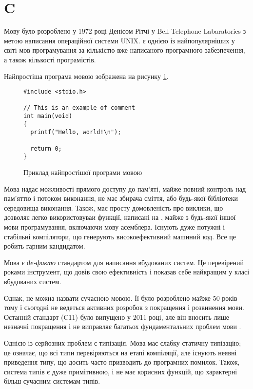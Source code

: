 \documentclass[main.tex]{subfiles}
\begin{document}
\section{C}

Мову \LangC{} було розроблено у 1972 році Денісом Рітчі у Bell Telephone Labaratories з метою написання операційної системи UNIX\cite{stewart-bill:history-of-c}. \LangC{} є однією із найпопулярніших у світі мов програмування за кількістю вже написаного програмного забезпечення, а також кількості програмістів.

Найпростіша програма мовою \LangC{} зображена на рисунку \ref{example:c}.

\begin{figure}[h]
  \centering
  \begin{BVerbatim}
#include <stdio.h>

// This is an example of comment
int main(void)
{
  printf("Hello, world!\n");

  return 0;
}
  \end{BVerbatim}
  \caption{Приклад найпростішої програми мовою \LangC{}}\label{example:c}
\end{figure}

Мова \LangC{} надає можливості прямого доступу до пам'яті, майже повний контроль над пам'яттю і потоком виконання, не має збирача сміття, або будь-якої бібліотеки середовища виконання. Також, \LangC{} має просту домовленість про виклики, що дозволяє легко використовуваи функції, написані на \LangC{}, майже з будь-якої іншої мови програмування, включаючи мову асемблера. Існують дуже потужні і стабільні компілятори, що генерують високоефективний машиний код. Все це робить \LangC{} гарним кандидатом.

Мова \LangC{} є \emph{де-факто} стандартом для написання вбудованих систем. Це перевірений роками інструмент, що довів свою ефективність і показав себе найкращим у класі вбудованих систем.

Однак, \LangC{} не можна назвати сучасною мовою. Її було розроблено майже 50 років тому і сьогодні не ведеться активних розробок з покращення і розвинення мови. Останній стандарт (C11) було випущено у 2011 році, але він вносить лише незначні покращення і не виправляє багатьох фундаментальних проблем мови \LangC{}.

Однією із серйозних проблем \LangC{} є типізація. Мова \LangC{} має слабку статичну типізацію; це означає, що всі типи перевіряються на етапі компіляції, але існують неявні приведення типу, що досить часто призводить до програмних помилок. Також, система типів є дуже примітивною, і не має корисних функцій, що характерні більш сучасним системам типів.
\end{document}
